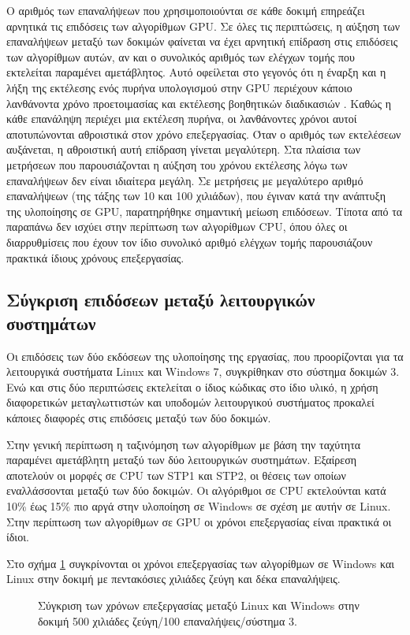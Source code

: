 Ο αριθμός των επαναλήψεων που χρησιμοποιούνται σε κάθε δοκιμή επηρεάζει αρνητικά τις επιδόσεις των αλγορίθμων GPU. Σε όλες τις περιπτώσεις, η αύξηση των επαναλήψεων μεταξύ των δοκιμών φαίνεται να έχει αρνητική επίδραση στις επιδόσεις των αλγορίθμων αυτών, αν και ο συνολικός αριθμός των ελέγχων τομής που εκτελείται παραμένει αμετάβλητος. Αυτό οφείλεται στο γεγονός ότι η έναρξη και η λήξη της εκτέλεσης ενός πυρήνα υπολογισμού στην GPU περιέχουν κάποιο λανθάνοντα χρόνο προετοιμασίας και εκτέλεσης βοηθητικών διαδικασιών \cite{ATIOpenCL}. Καθώς η κάθε επανάληψη περιέχει μια εκτέλεση πυρήνα, οι λανθάνοντες χρόνοι αυτοί αποτυπώνονται αθροιστικά στον χρόνο επεξεργασίας. Όταν ο αριθμός των εκτελέσεων αυξάνεται, η αθροιστική αυτή επίδραση  γίνεται μεγαλύτερη. Στα πλαίσια των μετρήσεων που παρουσιάζονται η αύξηση του χρόνου εκτέλεσης λόγω των επαναλήψεων δεν είναι ιδιαίτερα μεγάλη. Σε μετρήσεις με μεγαλύτερο αριθμό επαναλήψεων (της τάξης των 10 και 100 χιλιάδων), που έγιναν κατά την ανάπτυξη της υλοποίησης σε GPU, 
παρατηρήθηκε σημαντική μείωση επιδόσεων. Τίποτα από τα παραπάνω δεν ισχύει στην περίπτωση των αλγορίθμων CPU, όπου όλες οι διαρρυθμίσεις που έχουν τον ίδιο συνολικό αριθμό ελέγχων τομής παρουσιάζουν πρακτικά ίδιους χρόνους επεξεργασίας.

\subsection{Σύγκριση επιδόσεων μεταξύ λειτουργικών συστημάτων}
\noindent Οι επιδόσεις των δύο εκδόσεων της υλοποίησης της εργασίας, που προορίζονται για τα λειτουργικά συστήματα Linux και Windows 7, συγκρίθηκαν στο σύστημα δοκιμών 3. Ενώ και στις δύο περιπτώσεις εκτελείται ο ίδιος κώδικας στο ίδιο υλικό, η χρήση διαφορετικών μεταγλωττιστών και υποδομών λειτουργικού συστήματος προκαλεί κάποιες διαφορές στις επιδόσεις μεταξύ των δύο δοκιμών.

Στην γενική περίπτωση η ταξινόμηση των αλγορίθμων με βάση την ταχύτητα παραμένει αμετάβλητη μεταξύ των δύο λειτουργικών συστημάτων. Εξαίρεση αποτελούν οι μορφές σε CPU των STP1 και STP2, οι θέσεις των οποίων εναλλάσσονται μεταξύ των δύο δοκιμών. Οι αλγόριθμοι σε CPU εκτελούνται κατά 10\% έως 15\% πιο αργά στην υλοποίηση σε Windows σε σχέση με αυτήν σε Linux. Στην περίπτωση των αλγορίθμων σε GPU οι χρόνοι επεξεργασίας είναι πρακτικά οι ίδιοι.

Στο σχήμα \ref{gpuoscomp} συγκρίνονται οι χρόνοι επεξεργασίας των αλγορίθμων σε Windows και Linux στην δοκιμή με πεντακόσιες χιλιάδες ζεύγη και δέκα επαναλήψεις. 

\begin{figure}[h!]
\begin{center}
\scalebox{0.9}{

}
\scalebox{0.9}{

}
\end{center}
\caption{Σύγκριση των χρόνων επεξεργασίας μεταξύ Linux και Windows στην δοκιμή 500 χιλιάδες ζεύγη/100 επαναλήψεις/σύστημα 3.}
\label{gpuoscomp}
\end{figure}

\UndefineShortVerb{\!}